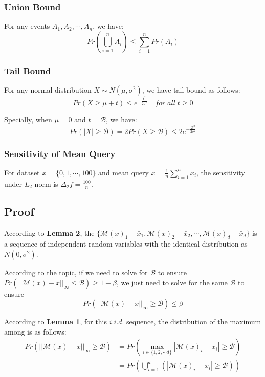 \documentclass[a4paper,12pt]{article}
\begin{document}
\subsubsection{Union Bound}
For any events $A_1, A_2, \cdots, A_n$, we have:
\begin{equation}
    Pr(\bigcup_{i = 1}^{n}A_i) \leq \sum_{i = 1}^{n}Pr(A_i)
\end{equation}

\subsubsection{Tail Bound}
For any normal distribution $X \sim N(\mu, \sigma^2)$, we have tail bound as follows:
\begin{equation}
    Pr(X \geq \mu + t) \leq e^{-\frac{t^2}{2\sigma^2}} \quad for \; all \; t \geq 0
\end{equation}

Specially, when $\mu = 0$ and $t = \mathcal{B}$, we have:
\begin{equation}
    Pr(|X| \geq \mathcal{B}) = 2Pr(X \geq \mathcal{B}) \leq 2e^{-\frac{\mathcal{B}^2}{2\sigma^2}}
\end{equation}

\subsubsection{Sensitivity of Mean Query}
For dataset $x = \{0, 1, \cdots, 100\}$ and mean query $\bar{x} = \frac{1}{n}\sum_{i = 1}^{n}x_i$, the sensitivity under $L_2$ norm is $\Delta_2 f = \frac{100}{n}$.
\subsection{Proof}
According to \textbf{Lemma 2}, the $\{\mathcal{M}(x)_1 - \bar{x}_1, \mathcal{M}(x)_2 - \bar{x}_2, \cdots, \mathcal{M}(x)_d - \bar{x}_d\}$ is a sequence of independent random variables with the identical distribution as $N(0, \sigma^2)$.

According to the topic, if we need to solve for $\mathcal{B}$ to ensure $Pr(||\mathcal{M}(x) - \bar{x}||_{\infty} \leq \mathcal{B}) \geq 1 - \beta$, we just need to solve for the same $\mathcal{B}$ to ensure
\begin{equation}
    Pr(||\mathcal{M}(x) - \bar{x}||_{\infty} \geq \mathcal{B}) \leq \beta
\end{equation}

According to \textbf{Lemma 1}, for this $i.i.d.$ sequence, the distribution of the maximum among is as follows:
\begin{equation}
    \begin{aligned}
        Pr(||\mathcal{M}(x) - \bar{x}||_{\infty} \geq \mathcal{B}) & = Pr(\max_{i\in \{1, 2, \cdots d\}}|\mathcal{M}(x)_i - \bar{x}_i| \geq \mathcal{B}) \\
                                                                   & = Pr(\bigcup_{i = 1}^{d}(|\mathcal{M}(x)_i - \bar{x}_i| \geq \mathcal{B}))          \\
    \end{aligned}
\end{equation}
\end{document}
